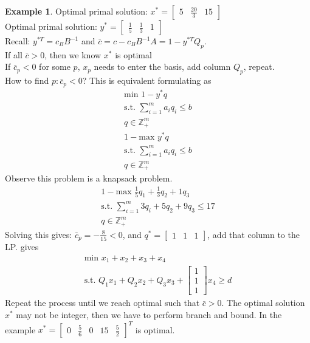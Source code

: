 \documentclass{article}
\theoremstyle{plain}
\theoremstyle{definition}
\newtheorem{eg}{Example}
\begin{document}
\begin{eg}
    Optimal primal solution: $x^* = \begin{bmatrix} 5 & \frac{20}{3} & 15\end{bmatrix}$\\
    Optimal primal solution:
    $y^* = \begin{bmatrix} \frac{1}{5} & \frac{1}{3} & 1\end{bmatrix}$\\
    Recall: $y^{*T} = c_BB^{-1}$ and $\bar{c} = c - c_BB^{-1}A = 1 - y^{*T}Q_p$.\\
    If all $\bar{c} > 0$, then we know $x^*$ is optimal\\
    If $\bar{c}_p < 0$ for some $p$, $x_p$
    needs to enter the basis, add column $Q_p$, repeat.\\
    How to find $p: \bar{c}_p < 0$? This is equivalent formulating as
    \begin{gather*}
        \text{min } 1 - y^*q\\
        \text{s.t. } \sum^m_{i=1}a_iq_i \leq b\\
        q\in\mathbb{Z}^m_+
    \end{gather*}
    \begin{gather*}
        1- \text{max } y^*q\\
        \text{s.t. } \sum^m_{i=1}a_iq_i \leq b\\
        q\in\mathbb{Z}^m_+
    \end{gather*}
    Observe this problem is a knapsack problem.
    \begin{gather*}
        1- \text{max } \frac{1}{5}q_1 + \frac{1}{3}q_2 + 1q_3\\
        \text{s.t. } \sum^m_{i=1}3q_i + 5q_2 + 9q_3 \leq 17\\
        q\in\mathbb{Z}^m_+
    \end{gather*}
    Solving this gives: $\bar{c}_p = -\frac{8}{15} < 0$, and
    $q^* = \begin{bmatrix} 1 & 1 & 1 \end{bmatrix}$, add that column to the LP. gives
    \begin{gather*}
        \text{min } x_1 + x_2 + x_3 + x_4\\
        \text{s.t. } Q_1x_1 + Q_2x_2 + Q_3x_3 +
        \begin{bmatrix} 1 \\ 1 \\ 1\end{bmatrix}x_4 \geq d
    \end{gather*}
    Repeat the process until we reach optimal such that $\bar{c} > 0$. The optimal
    solution $x^*$ may not be integer, then we have to perform branch and bound.
    In the example $x^* = \begin{bmatrix} 0 & \frac{5}{6} & 0 & 15 & \frac{5}{2}
    \end{bmatrix}^T$ is optimal.
\end{eg}
\end{document}
